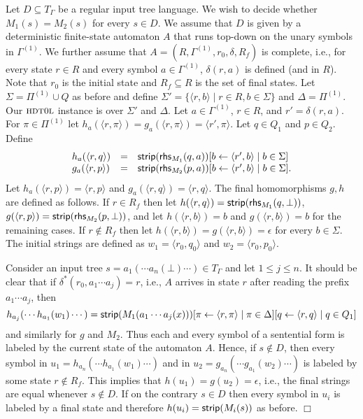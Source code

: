 \documentclass[copyright,creativecommons]{eptcs}
\newcommand{\eop}{\hspace*{\fill}$\Box$}
\newenvironment{proof}{{\it Proof.}\quad}{\eop\vspace*{4mm}}
\newcommand{\hdtol}{\textsc{hdt{\small 0}l}}
\def\strip{{\sf strip}}
\def\rhs{{\sf rhs}}
\begin{document}
\begin{proof}
Let $D\subseteq T_\Gamma$ be a regular input tree language.
We wish to decide whether $M_1(s)=M_2(s)$ for every $s\in D$.
We assume that $D$ is given by a deterministic finite-state automaton $A$ that runs top-down on the
unary symbols in $\Gamma^{(1)}$. We further assume that 
$A=(R,\Gamma^{(1)},r_0,\delta,R_f)$ is complete, i.e., 
for every state $r\in R$ and every symbol $a\in\Gamma^{(1)}$,
$\delta(r,a)$ is defined (and in $R$). Note that $r_0$ is the initial state and $R_f\subseteq R$ is
the set of final states. 
Let $\Sigma=\Pi^{(1)}\cup Q$ as before and define
$\Sigma'=\{\langle r,b\rangle\mid r\in R, b\in\Sigma\}$ and $\Delta=\Pi^{(1)}$.
Our $\hdtol$ instance is over $\Sigma'$ and $\Delta$.
Let $a\in\Gamma^{(1)}$, $r\in R$, and $r'=\delta(r,a)$.
For $\pi\in\Pi^{(1)}$ let 
$h_a(\langle r,\pi\rangle)=g_a(\langle r,\pi\rangle)=\langle r',\pi\rangle$.
Let $q\in Q_1$ and $p\in Q_2$.
Define
\[
\begin{array}{lcl}
h_a(\langle r,q\rangle )&=&\strip(\rhs_{M_1}(q,a))[b\leftarrow\langle r',b\rangle\mid b\in\Sigma]\\
g_a(\langle r,p\rangle )&=&\strip(\rhs_{M_2}(p,a))[b\leftarrow\langle r',b\rangle\mid b\in\Sigma].
\end{array}
\]
Let $h_a(\langle r,p\rangle)=\langle r,p\rangle$ and 
$g_a(\langle r,q\rangle)=\langle r,q\rangle$.
The final homomorphisms $g, h$ are defined as follows.
If $r\in R_f$ then let
$h(\langle r,q\rangle)=\strip(\rhs_{M_1}(q,\bot))$,
$g(\langle r,p\rangle)=\strip(\rhs_{M_2}(p,\bot))$, and 
let $h(\langle r,b\rangle)=b$ and  $g(\langle r,b\rangle)=b$
for the remaining cases.
If $r\not\in R_f$ then let
$h(\langle r,b\rangle) = g(\langle r,b\rangle) = \epsilon$
for every $b\in\Sigma$.
The initial strings are defined as $w_1=\langle r_0,q_0\rangle$ and
$w_2=\langle r_0,p_0\rangle$.

Consider an input tree $s=a_1(\cdots a_n(\bot)\cdots)\in T_\Gamma$
and let $1\leq j\leq n$.
It should be clear that if $\delta^*(r_0,a_1\cdots a_j)=r$, i.e.,
$A$ arrives in state $r$ after reading the prefix $a_1\cdots a_j$,
then 
\[
h_{a_j}(\cdots h_{a_1}(w_1)\cdots ) = 
\strip(M_1(a_1\cdots a_j(x)))[\pi\leftarrow\langle r,\pi\rangle\mid\pi\in\Delta]
[q\leftarrow\langle r,q\rangle\mid q\in Q_1]
\]
and similarly for $g$ and $M_2$. Thus each and every symbol of a sentential form
is labeled by the current state of the automaton $A$.
Hence, if $s\not\in D$, then every symbol in 
$u_1=h_{a_n}(\cdots h_{a_1}(w_1)\cdots)$ and in 
$u_2=g_{a_n}(\cdots g_{a_1}(w_2)\cdots)$ is labeled by some state $r\not\in R_f$.
This implies that $h(u_1) = g(u_2) =\epsilon$, i.e., the final strings are
equal whenever $s\not\in D$. If on the contrary $s\in D$ then 
every symbol in $u_i$ is labeled by a final state and therefore
$h(u_i)=\strip(M_i(s))$ as before.
\end{proof}
\end{document}
